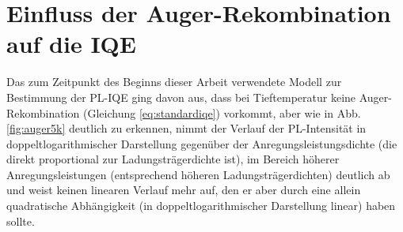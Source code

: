 
\chapter{Einfluss der Auger-Rekombination auf die IQE}
\label{chap:auger}
\thispagestyle{fancy}
Das zum Zeitpunkt des Beginns dieser Arbeit verwendete Modell zur Bestimmung der PL-IQE ging davon aus, dass bei Tieftemperatur keine Auger-Rekombination (Gleichung \ref{eq:standardiqe}) vorkommt, aber wie in Abb. \ref{fig:auger5k} deutlich zu erkennen, nimmt der Verlauf der PL-Intensität in doppeltlogarithmischer Darstellung gegenüber der Anregungsleistungsdichte (die direkt proportional zur Ladungsträgerdichte ist), im Bereich höherer Anregungsleistungen (entsprechend höheren Ladungsträgerdichten) deutlich ab und weist keinen linearen Verlauf mehr auf, den er aber durch eine allein quadratische Abhängigkeit (in doppeltlogarithmischer Darstellung linear) haben sollte. 
\newline
